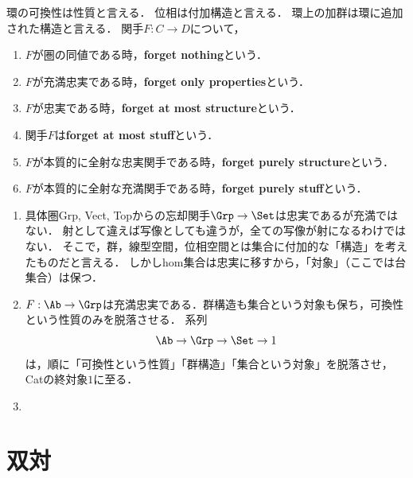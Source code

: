 \documentclass[uplatex,dvipdfmx]{jsreport}
\begin{document}
\begin{definition}\label{def-SSP}
    環の可換性は性質と言える．
    位相は付加構造と言える．
    環上の加群は環に追加された構造と言える．
    関手$F:C\to D$について，
    \begin{enumerate}
        \item $F$が圏の同値である時，\textbf{forget nothing}という．
        \item $F$が充満忠実である時，\textbf{forget only properties}という．
        \item $F$が忠実である時，\textbf{forget at most structure}という．
        \item 関手$F$は\textbf{forget at most stuff}という．
        \item $F$が本質的に全射な忠実関手である時，\textbf{forget purely structure}という．
        \item $F$が本質的に全射な充満関手である時，\textbf{forget purely stuff}という．
    \end{enumerate}
\end{definition}

\begin{example}\mbox{}
    \begin{enumerate}
        \item 具体圏Grp, Vect, Topからの忘却関手$\Grp\to\Set$は忠実であるが充満ではない．
        射として違えば写像としても違うが，全ての写像が射になるわけではない．
        そこで，群，線型空間，位相空間とは集合に付加的な「構造」を考えたものだと言える．
        しかしhom集合は忠実に移すから，「対象」（ここでは台集合）は保つ．
        \item $F:\Ab\to\Grp$は充満忠実である．群構造も集合という対象も保ち，可換性という性質のみを脱落させる．
        系列\[\Ab\to\Grp\to\Set\to1\]
        は，順に「可換性という性質」「群構造」「集合という対象」を脱落させ，Catの終対象$1$に至る．
        \item 
    \end{enumerate}
\end{example}

\section{双対}
\end{document}

